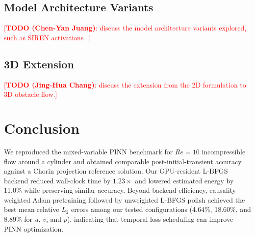 \documentclass{article}
\begin{document}
\subsection{Model Architecture Variants}

\textcolor{red}{[\textbf{TODO (Chen-Yan Juang)}: discuss the model architecture variants explored, such as SIREN activations~\cite{sitzmann2020siren}.]}

\subsection{3D Extension}
\label{sec:3d}

\textcolor{red}{[\textbf{TODO (Jing-Hua Chang)}: discuss the extension from the 2D formulation to 3D obstacle flow.]}

\section{Conclusion}

We reproduced the mixed-variable PINN benchmark for $Re=10$ incompressible flow around a cylinder and obtained comparable post-initial-transient accuracy against a Chorin projection reference solution. Our GPU-resident L-BFGS backend reduced wall-clock time by $1.23\times$ and lowered estimated energy by 11.0\% while preserving similar accuracy. Beyond backend efficiency, causality-weighted Adam pretraining followed by unweighted L-BFGS polish achieved the best mean relative $L_2$ errors among our tested configurations (4.64\%, 18.60\%, and 8.89\% for $u$, $v$, and $p$), indicating that temporal loss scheduling can improve PINN optimization.
\end{document}
